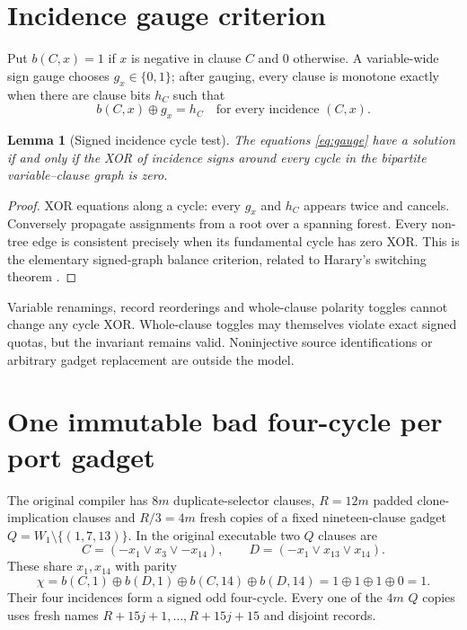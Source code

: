 \documentclass[11pt]{article}
\newtheorem{lemma}[theorem]{Lemma}
\begin{document}
\section{Incidence gauge criterion}
Put $b(C,x)=1$ if $x$ is negative in clause $C$ and $0$ otherwise. A variable-wide sign gauge chooses $g_x\in\{0,1\}$; after gauging, every clause is monotone exactly when there are clause bits $h_C$ such that
\begin{equation}
b(C,x)\oplus g_x=h_C\quad\text{for every incidence }(C,x). \label{eq:gauge}
\end{equation}
\begin{lemma}[Signed incidence cycle test]
The equations \eqref{eq:gauge} have a solution if and only if the XOR of incidence signs around every cycle in the bipartite variable--clause graph is zero.
\end{lemma}
\begin{proof}
XOR equations along a cycle: every $g_x$ and $h_C$ appears twice and cancels. Conversely propagate assignments from a root over a spanning forest. Every non-tree edge is consistent precisely when its fundamental cycle has zero XOR. This is the elementary signed-graph balance criterion, related to Harary's switching theorem \cite{Harary}.
\end{proof}
Variable renamings, record reorderings and whole-clause polarity toggles cannot change any cycle XOR. Whole-clause toggles may themselves violate exact signed quotas, but the invariant remains valid. Noninjective source identifications or arbitrary gadget replacement are outside the model.

\section{One immutable bad four-cycle per port gadget}
The original compiler has $8m$ duplicate-selector clauses, $R=12m$ padded clone-implication clauses and $R/3=4m$ fresh copies of a fixed nineteen-clause gadget $Q=W_1\setminus\{(1,7,13)\}$. In the original executable two $Q$ clauses are
\begin{equation}
C=(-x_1\lor x_3\lor -x_{14}),\qquad
D=(-x_1\lor x_{13}\lor x_{14}). \label{eq:bad}
\end{equation}
These share $x_1,x_{14}$ with parity
\begin{equation}
\chi=b(C,1)\oplus b(D,1)\oplus b(C,14)\oplus b(D,14)
=1\oplus1\oplus1\oplus0=1. \label{eq:chi}
\end{equation}
Their four incidences form a signed odd four-cycle. Every one of the $4m$ $Q$ copies uses fresh names $R+15j+1,\ldots,R+15j+15$ and disjoint records.
\end{document}
